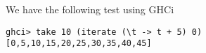
We have the following test using GHCi
\scriptsize\begin{verbatim}
ghci> take 10 (iterate (\t -> t + 5) 0)
[0,5,10,15,20,25,30,35,40,45]
\end{verbatim}\normalsize
